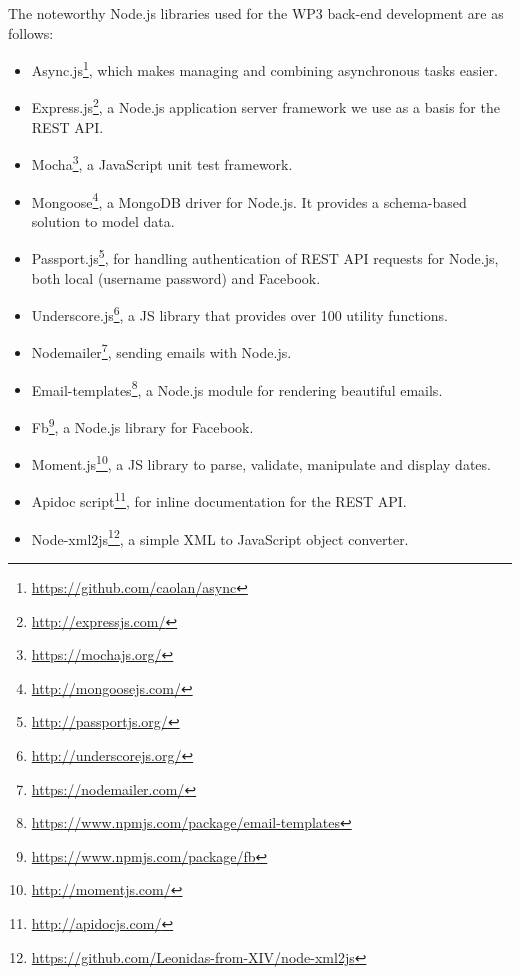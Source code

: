 The noteworthy Node.js libraries used for the WP3 back-end development are as follows:

\begin{itemize}

\item Async.js\footnote{\url{https://github.com/caolan/async}}, which makes managing and combining asynchronous tasks easier. 

\item Express.js\footnote{\url{http://expressjs.com/}}, a Node.js application server framework we use as a basis for the REST API. 

\item Mocha\footnote{\url{https://mochajs.org/}}, a JavaScript unit test framework. 

\item Mongoose\footnote{\url{http://mongoosejs.com/}}, a MongoDB driver for Node.js. It provides a schema-based solution to model data. 

\item Passport.js\footnote{\url{http://passportjs.org/}}, for handling authentication of REST API requests for Node.js, both local (username password) and Facebook. 

\item Underscore.js\footnote{\url{http://underscorejs.org/}}, a JS library that provides over 100 utility functions. 

\item Nodemailer\footnote{\url{https://nodemailer.com/}}, sending emails with Node.js.

\item Email-templates\footnote{\url{https://www.npmjs.com/package/email-templates}}, a Node.js module for rendering beautiful emails.

\item Fb\footnote{\url{https://www.npmjs.com/package/fb}}, a Node.js library for Facebook.

\item Moment.js\footnote{\url{http://momentjs.com/}}, a JS library to parse, validate, manipulate and display dates. 

\item Apidoc script\footnote{\url{http://apidocjs.com/}}, for inline documentation for the REST API. 

\item Node-xml2js\footnote{\url{https://github.com/Leonidas-from-XIV/node-xml2js}}, a simple XML to JavaScript object converter. 


\end{itemize}
